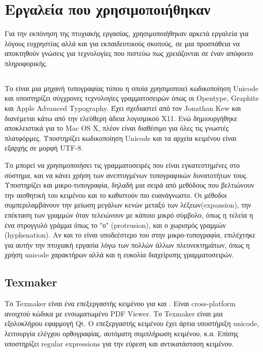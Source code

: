 \section{Εργαλεία που χρησιμοποιήθηκαν}
Για την εκπόνηση της πτυχιακής εργασίας, χρησιμοποιήθηκαν αρκετά εργαλεία για λόγους ευχρηστίας αλλά και για εκπαιδευτικούς σκοπούς, σε μια προσπάθεια να αποκτηθούν γνώσεις για τεχνολογίες που πιστεύω πως χρειάζονται σε έναν απόφοιτο πληροφορικής.
\subsection{}
Το  είναι μια μηχανή τυπογραφίας τύπου  η οποία χρησιμοποιεί κωδικοποίηση Unicode και υποστηρίζει σύγχρονες τεχνολογίες γραμματοσειρών όπως οι Opentype, Graphite και Apple Advanced Typography. Έχει σχεδιαστεί από τον Jonathan Kew και διανέμεται κάτω από την ελεύθερη άδεια λογισμικού X11. Ενώ δημιουργήθηκε αποκλειστικά για το Mac OS X, πλέον είναι διαθέσιμο για όλες τις γνωστές πλατφόρμες. Υποστηρίζει κωδικοποίηση Unicode και τα αρχεία κειμένου είναι εξαρχής σε μορφή UTF-8.

Το  μπορεί να χρησιμοποιήσει τις γραμματοσειρές που είναι εγκατεστημένες στο σύστημα, και να κάνει χρήση των ανεπτυγμένων τυπογραφικών δυνατοτήτων τους. Υποστηρίζει και μικρο-τυπογραφία, δηλαδή μια σειρά από μεθόδους που βελτιώνουν την αισθητική του κειμένου και το καθιστούν πιο ευανάγνωστο. Οι μέθοδοι συμπεριλαμβάνουν την μείωση μεγάλων κενών μεταξύ των λέξεων(expansion), την επέκταση των γραμμών όταν τελειώνουν με κάποιο μικρό σύμβολο, όπως η τελεία η ένα στρογγυλό γράμμα όπως το "ο" (protrusion), και ο χωρισμός γραμμών (hyphenation). Αν και το  είναι υποδεέστερο του  στην μικρο-τυπογραφία, επιλέχτηκε για αυτήν την πτυχιακή εργασία λόγω των πολλών άλλων πλεονεκτημάτων, όπως η χρήση unicode χαρακτήρων αλλά και η ευκολία διαχείρισης γραμματοσειρών.

\subsection{Texmaker}
Το Texmaker είναι ένα επεξεργαστής κειμένου για  και . Είναι cross-platform ανοιχτού κώδικα με ενσωματωμένο PDF Viewer. Το Texmaker είναι μια εξολοκλήρου εφαρμογή Qt.
O επεξεργαστής κειμένου έχει άρτια υποστήριξη unicode, λειτουργία ελέγχου ορθογραφίας, αυτόματη συμπλήρωση κειμένου, κ.α. Επίσης υποστηρίζει regular expressions για την εύρεση και αντικατάσταση κειμένου.

